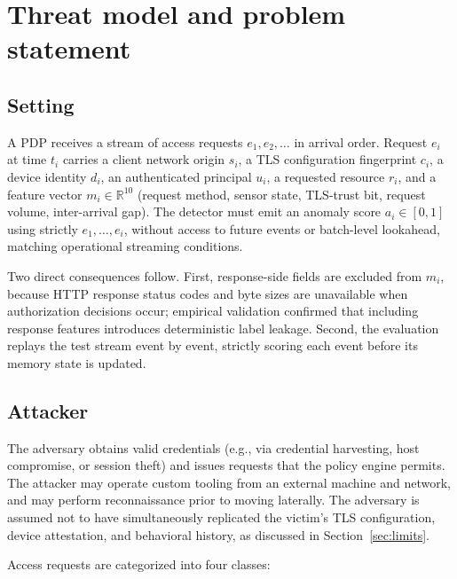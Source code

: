 \section{Threat model and problem statement}
\label{sec:problem}

\subsection{Setting}

A PDP receives a stream of access requests $e_1, e_2, \dots$ in arrival order. Request
$e_i$ at time $t_i$ carries a client network origin $s_i$, a TLS configuration
fingerprint $c_i$, a device identity $d_i$, an authenticated principal $u_i$, a
requested resource $r_i$, and a feature vector $m_i \in \mathbb{R}^{10}$ (request
method, sensor state, TLS-trust bit, request volume, inter-arrival gap). The detector
must emit an anomaly score $a_i \in [0,1]$ using strictly $e_1, \dots, e_i$, without access
to future events or batch-level lookahead, matching operational streaming conditions.

Two direct consequences follow. First, response-side fields are excluded from
$m_i$, because HTTP response status codes and byte sizes are unavailable when authorization
decisions occur; empirical validation confirmed that including response features introduces
deterministic label leakage. Second, the evaluation replays the test stream event by
event, strictly scoring each event before its memory state is updated.

\subsection{Attacker}

The adversary obtains valid credentials (e.g., via credential harvesting, host compromise,
or session theft) and issues requests that the policy engine permits. The attacker may
operate custom tooling from an external machine and network, and may perform reconnaissance
prior to moving laterally. The adversary is assumed not to have simultaneously replicated
the victim's TLS configuration, device attestation, and behavioral history, as discussed
in Section~\ref{sec:limits}.

Access requests are categorized into four classes:

